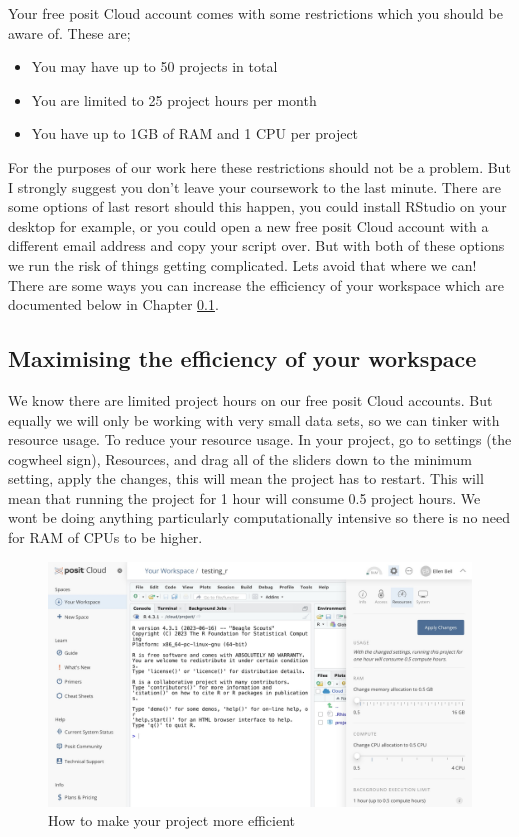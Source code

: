 \documentclass[
]{book}
\providecommand{\tightlist}{%
  \setlength{\itemsep}{0pt}\setlength{\parskip}{0pt}}
\begin{document}
Your free posit Cloud account comes with some restrictions which you should be aware of. These are;

\begin{itemize}
\tightlist
\item
  You may have up to 50 projects in total
\item
  You are limited to 25 project hours per month
\item
  You have up to 1GB of RAM and 1 CPU per project
\end{itemize}

For the purposes of our work here these restrictions should not be a problem. But I strongly suggest you don't leave your coursework to the last minute. There are some options of last resort should this happen, you could install RStudio on your desktop for example, or you could open a new free posit Cloud account with a different email address and copy your script over. But with both of these options we run the risk of things getting complicated. Lets avoid that where we can! There are some ways you can increase the efficiency of your workspace which are documented below in Chapter \ref{efficiency}.

\hypertarget{efficiency}{%
\subsection{Maximising the efficiency of your workspace}\label{efficiency}}

We know there are limited project hours on our free posit Cloud accounts. But equally we will only be working with very small data sets, so we can tinker with resource usage. To reduce your resource usage. In your project, go to settings (the cogwheel sign), Resources, and drag all of the sliders down to the minimum setting, apply the changes, this will mean the project has to restart. This will mean that running the project for 1 hour will consume 0.5 project hours. We wont be doing anything particularly computationally intensive so there is no need for RAM of CPUs to be higher.

\begin{figure}
\includegraphics[width=0.9\linewidth]{figures/posit5} \caption{How to make your project more efficient}\label{fig:unnamed-chunk-5}
\end{figure}
\end{document}
